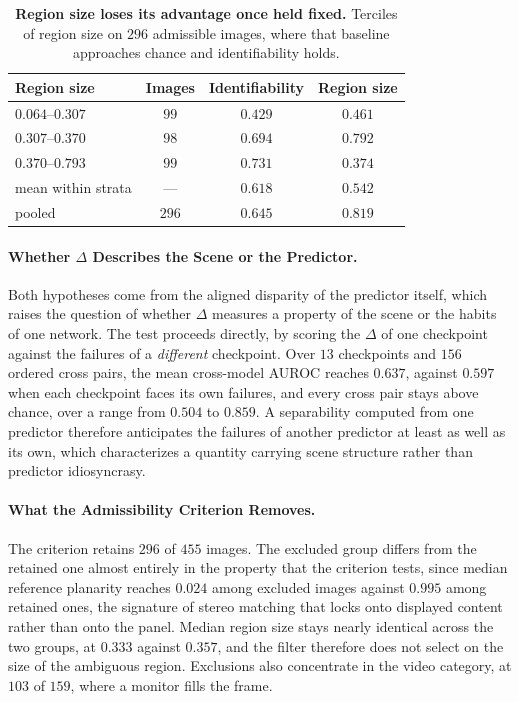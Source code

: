 \documentclass{article} %
\theoremstyle{defstyle}
\theoremstyle{plain}
\begin{document}
\begin{table}[!ht]
\caption{\textbf{Region size loses its advantage once held fixed.} Terciles of region size on $296$
admissible images, where that baseline approaches chance and identifiability holds.}
\label{tab:supp-strata}
\begin{center}
\footnotesize
\begin{tabular}{lccc}
\toprule
\textbf{Region size} & \textbf{Images} & \textbf{Identifiability} & \textbf{Region size} \\
\midrule
$0.064$--$0.307$ & $99$ & $0.429$ & $0.461$ \\
$0.307$--$0.370$ & $98$ & $0.694$ & $0.792$ \\
$0.370$--$0.793$ & $99$ & $0.731$ & $0.374$ \\
\midrule
mean within strata & --- & $\mathbf{0.618}$ & $0.542$ \\
pooled & $296$ & $0.645$ & $\mathbf{0.819}$ \\
\bottomrule
\end{tabular}
\end{center}
\end{table}

\paragraph{Whether $\Delta$ Describes the Scene or the Predictor.}
Both hypotheses come from the aligned disparity of the predictor itself, which raises the
question of whether $\Delta$ measures a property of the scene or the habits of one network.
The test proceeds directly, by scoring the $\Delta$ of one checkpoint against the failures of
a \emph{different} checkpoint. Over $13$ checkpoints and $156$ ordered cross pairs, the mean
cross-model AUROC reaches $\mathbf{0.637}$, against $0.597$ when each checkpoint faces its
own failures, and every cross pair stays above chance, over a range from $0.504$ to $0.859$.
A separability computed from one predictor therefore anticipates the failures of another
predictor at least as well as its own, which characterizes a quantity carrying scene
structure rather than predictor idiosyncrasy.

\paragraph{What the Admissibility Criterion Removes.}
The criterion retains $296$ of $455$ images. The excluded group differs from the retained
one almost entirely in the property that the criterion tests, since median reference
planarity reaches $0.024$ among excluded images against $0.995$ among retained ones, the
signature of stereo matching that locks onto displayed content rather than onto the panel.
Median region size stays nearly identical across the two groups, at $0.333$ against $0.357$,
and the filter therefore does not select on the size of the ambiguous region. Exclusions also
concentrate in the video category, at $103$ of $159$, where a monitor fills the frame.
\end{document}
